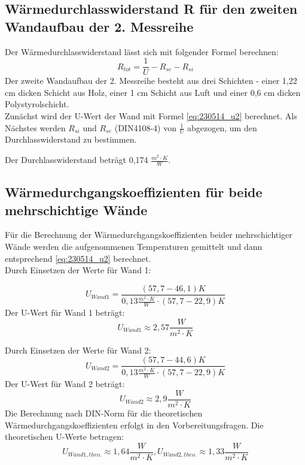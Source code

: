\subsection{Wärmedurchlasswiderstand R für den zweiten Wandaufbau der 2. Messreihe}
Der Wärmedurchlasswiderstand lässt sich mit folgender Formel berechnen:
%
\begin{equation}
R_{tot}=\frac{1} {U} - R_{se} - R_{si}
  \label{eq:230522_Wärmewiderstand}
\end{equation}
%
Der zweite Wandaufbau der 2. Messreihe besteht aus drei Schichten - einer 1,22 cm dicken Schicht aus Holz, einer 1 cm Schicht aus Luft und einer 0,6 cm dicken Polystyrolschicht.\\
Zunächst wird der U-Wert der Wand mit Formel \ref{eq:230514_u2}  berechnet. Als Nächstes werden $R_{si}$ und $R_{se}$ (DIN4108-4) von  $\frac{1}{U}$ abgezogen, um den Durchlasswiderstand zu bestimmen. 

Der Durchlasswiderstand beträgt 0,174 $\frac{ m^2 \cdot K }{W}$. 

\subsection{Wärmedurchgangskoeffizienten für beide mehrschichtige Wände}
Für die Berechnung der Wärmedurchgangskoeffizienten beider mehrschichtiger Wände werden die aufgenommenen Temperaturen gemittelt und dann entsprechend \autoref{eq:230514_u2} berechnet.\\
Durch Einsetzen der Werte für Wand 1:

$$U_{Wand1} = \frac{(57,7-46,1)K }{ 0,13 \frac{m^2\cdot K}{W}\cdot  (57,7 - 22,9)K}$$
Der U-Wert für Wand 1 beträgt:
\begin{equation*}
  U_{Wand 1} \approx 2,57 \frac{W}{m^2 \cdot K}
\end{equation*}

Durch Einsetzen der Werte für Wand 2:
$$U_{Wand2} = \frac{(57,7-44,6)K }{ 0,13 \frac{m^2\cdot K}{W}\cdot  (57,7 - 22,9)K}$$
Der U-Wert für Wand 2 beträgt:
\begin{equation*}
  U_{Wand 2} \approx 2,9 \frac{W}{m^2 \cdot K}
\end{equation*}
\newpage
Die Berechnung nach DIN-Norm für die theoretischen Wärmedurchgangskoeffizienten erfolgt in den Vorbereitungsfragen.
Die theoretischen U-Werte betragen:
\begin{equation*}
  U_{Wand 1,theo.}\approx 1,64 \frac{W}{m^2 \cdot K}, U_{Wand 2,theo.}\approx 1,33 \frac{W}{m^2 \cdot K}
\end{equation*}

